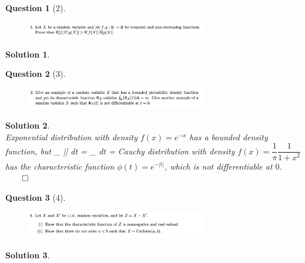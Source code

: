\documentclass{article} %
\def\eQb#1\eQe{\begin{eqnarray*}#1\end{eqnarray*}}
\theoremstyle{quest}
\newtheorem*{question}{Question}
\newtheorem*{solution}{Solution}
\begin{document}
\begin{question}[2]
\hfill
\begin{figure}[h!]
  \centering
    \includegraphics[width=0.7\textwidth]{prob-e3-p2.png}
\end{figure}
\end{question}
\begin{solution} \hfill \\
\end{solution}

\newpage

\begin{question}[3]
\hfill
\begin{figure}[h!]
  \centering
    \includegraphics[width=0.7\textwidth]{prob-e3-p3.png}
\end{figure}
\end{question}
\begin{solution} \hfill \\
Exponential distribution with density $f(x) = e^{-x}$ 
has a bounded density function, but 
\eQb
\int_{} || dt = \int_{} 
dt = \infty 
\eQe
Cauchy distribution with density $f(x) = \dfrac{1}{\pi} \dfrac{1}{1+x^2}$ 
has the characteristic function $\phi(t) = e^{-|t|}$, which is not differentiable 
at $0$. \hfill $\qed$
\end{solution}

\newpage

\begin{question}[4]
\hfill
\begin{figure}[h!]
  \centering
    \includegraphics[width=0.7\textwidth]{prob-e3-p4.png}
\end{figure}
\end{question}
\begin{solution} \hfill \\
\end{solution}
\end{document}
